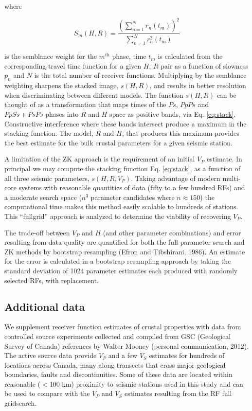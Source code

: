 \documentclass[review]{elsarticle}
\begin{document}
\noindent where

\begin{equation}
S_m(H,R) = \frac {\left( \sum_{n=1}^N r_n(t_m) \right)^2}
                 { \sum_{n=1}^N r_n^2(t_m) }
\end{equation}

\noindent is the semblance weight for the $m^{th}$ phase, time $t_m$ is calculated from the corresponding travel time function for a given $H$, $R$ pair as a function of slowness $p_n$ and $N$ is the total number of receiver functions. Multiplying by the semblance weighting sharpens the stacked image, $s(H,R)$, and results in better resolution when discriminating between different models. The function $s(H,R)$ can be thought of as a transformation that maps times of the $Ps$, $PpPs$ and $PpSs+PsPs$ phases into $R$ and $H$ space as positive bands, via Eq. \ref{eq:stack}. Constructive interference where these bands intersect produce a maximum in the stacking function. The model, $R$ and $H$, that produces this maximum provides the best estimate for the bulk crustal parameters for a given seismic station.

A limitation of the ZK approach is the requirement of an initial $V_P$ estimate. In principal we may compute the stacking function Eq. \ref{eq:stack}, as a function of all three seismic parameters, $s(H,R,V_P)$. Taking advantage of modern multi-core systems with reasonable quantities of data (fifty to a few hundred RFs) and a moderate search space ($n^3$ parameter candidates where $n \approx 150$) the computational time makes this method easily scalable to hundreds of stations. This ``fullgrid'' approach is analyzed to determine the viability of recovering $V_P$.

The trade-off between $V_P$ and $H$ (and other parameter combinations) and error resulting from data quality are quantified for both the full parameter search and ZK methods by bootstrap resampling (Efron and Tibshirani, 1986). An estimate for the error is calculated in a bootstrap resampling approach by taking the standard deviation of 1024 parameter estimates each produced with randomly selected RFs, with replacement.




\subsection{Additional data}

We supplement receiver function estimates of crustal properties with data from controlled source experiments collected and compiled from GSC (Geological Survey of Canada) references by Walter Mooney (personal communication, 2012). The active source data provide $V_P$ and a few $V_S$ estimates for hundreds of locations across Canada, many along transects that cross major geological boundaries, faults and discontinuities. Some of these data are located within reasonable ($<$100 km) proximity to seismic stations used in this study and can be used to compare with the $V_P$ and $V_S$ estimates resulting from the RF full gridsearch.
\end{document}
